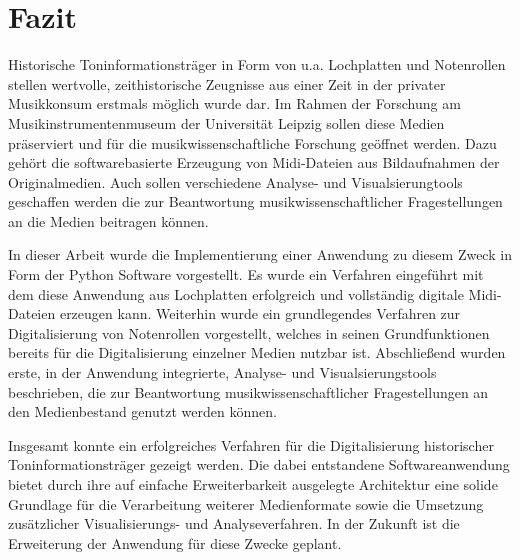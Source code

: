 \section{Fazit}

Historische Toninformationsträger in Form von u.a. Lochplatten und Notenrollen stellen wertvolle, zeithistorische Zeugnisse aus einer Zeit in der privater Musikkonsum erstmals möglich wurde dar.
Im Rahmen der Forschung am Musikinstrumentenmuseum der Universität Leipzig sollen diese Medien präserviert und für die musikwissenschaftliche Forschung geöffnet werden.
Dazu gehört die softwarebasierte Erzeugung von Midi-Dateien aus Bildaufnahmen der Originalmedien.
Auch sollen verschiedene Analyse- und Visualsierungtools geschaffen werden die zur Beantwortung musikwissenschaftlicher Fragestellungen an die Medien beitragen können.

In dieser Arbeit wurde die Implementierung einer Anwendung zu diesem Zweck in Form der Python Software  vorgestellt.
Es wurde ein Verfahren eingeführt mit dem diese Anwendung aus Lochplatten erfolgreich und vollständig digitale Midi-Dateien erzeugen kann.
Weiterhin wurde ein grundlegendes Verfahren zur Digitalisierung von Notenrollen vorgestellt, welches in seinen Grundfunktionen bereits für die Digitalisierung einzelner Medien nutzbar ist.
Abschließend wurden erste, in der Anwendung integrierte, Analyse- und Visualsierungstools beschrieben, die zur Beantwortung musikwissenschaftlicher Fragestellungen an den Medienbestand genutzt werden können.

Insgesamt konnte ein erfolgreiches Verfahren für die Digitalisierung historischer Toninformationsträger gezeigt werden.
Die dabei entstandene Softwareanwendung bietet durch ihre auf einfache Erweiterbarkeit ausgelegte Architektur eine solide Grundlage für die Verarbeitung weiterer Medienformate sowie die Umsetzung zusätzlicher Visualisierungs- und Analyseverfahren.
In der Zukunft ist die Erweiterung der Anwendung für diese Zwecke geplant.
